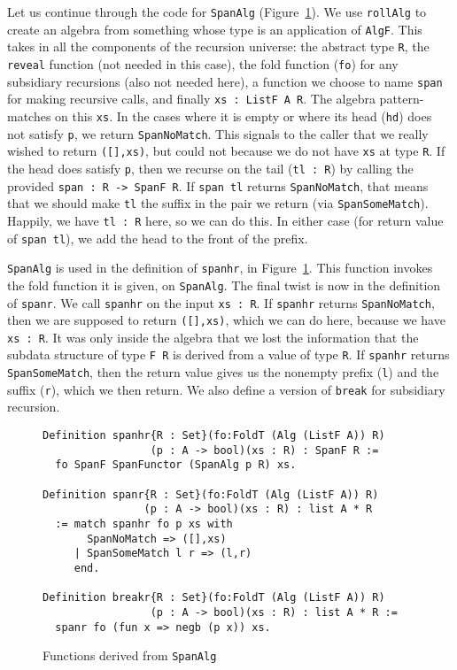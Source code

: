 \documentclass[a4paper,USenglish]{lipics-v2021}
\begin{document}
Let us continue through the code for \verb|SpanAlg|
(Figure~\ref{fig:span}).  We use \verb|rollAlg| to create an algebra
from something whose type is an application of \verb|AlgF|.  This
takes in all the components of the recursion universe: the abstract
type \verb|R|, the \verb|reveal| function (not needed in this case),
the fold function (\verb|fo|) for any subsidiary recursions (also not
needed here), a function we choose to name \verb|span| for making
recursive calls, and finally \verb|xs : ListF A R|.  The algebra
pattern-matches on this \verb|xs|.  In the cases where it is empty or
where its head (\verb|hd|) does not satisfy \verb|p|, we return
\verb|SpanNoMatch|.  This signals to the caller that we really wished
to return \verb|([],xs)|, but could not because we do not have
\verb|xs| at type \verb|R|.  If the head does satisfy \verb|p|, then
we recurse on the tail (\verb|tl : R|) by calling the provided \verb|span : R -> SpanF R|.
If \verb|span tl|
returns \verb|SpanNoMatch|, that means that we should make \verb|tl|
the suffix in the pair we return (via \verb|SpanSomeMatch|).  Happily,
we have \verb|tl : R| here, so we can do this.  In either case (for
return value of \verb|span tl|), we add the head to the front of the
prefix.

\verb|SpanAlg| is used in the definition of \verb|spanhr|, in
Figure~\ref{fig:span}.  This function invokes the fold function it is
given, on \verb|SpanAlg|.  The final twist is now in the definition of
\verb|spanr|.  We call \verb|spanhr| on the input \verb|xs : R|.  If
\verb|spanhr| returns \verb|SpanNoMatch|, then we are supposed to
return \verb|([],xs)|, which we can do here, because we have
\verb|xs : R|.  It was only inside the algebra that we lost the
information that the subdata structure of type \verb|F R| is derived
from a value of type \verb|R|.  If \verb|spanhr| returns
\verb|SpanSomeMatch|, then the return value gives us the nonempty
prefix (\verb|l|) and the suffix (\verb|r|), which we then return.  We
also define a version of \verb|break| for subsidiary recursion.


\begin{figure}
\begin{verbatim}
Definition spanhr{R : Set}(fo:FoldT (Alg (ListF A)) R)
                 (p : A -> bool)(xs : R) : SpanF R :=
  fo SpanF SpanFunctor (SpanAlg p R) xs.

Definition spanr{R : Set}(fo:FoldT (Alg (ListF A)) R)
                (p : A -> bool)(xs : R) : list A * R
  := match spanhr fo p xs with
       SpanNoMatch => ([],xs)
     | SpanSomeMatch l r => (l,r)
     end.

Definition breakr{R : Set}(fo:FoldT (Alg (ListF A)) R)
                 (p : A -> bool)(xs : R) : list A * R :=
  spanr fo (fun x => negb (p x)) xs.
\end{verbatim}
\caption{Functions derived from \texttt{SpanAlg}}
\label{fig:span}
\end{figure}
\end{document}
